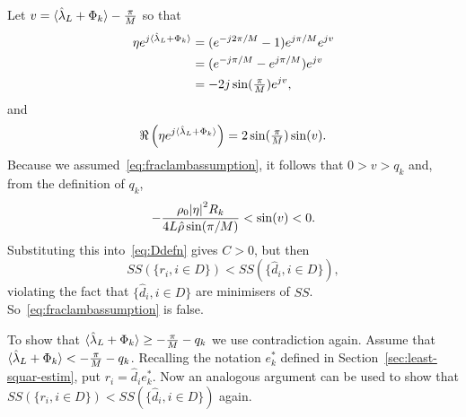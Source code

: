 \documentclass[draftcls, onecolumn, 11pt]{IEEEtran}
\begin{document}
\begin{IEEEproof}
Let $v = \langle \hat{\lambda}_L + \Phi_k \rangle - \tfrac{\pi}{M}$ so that
\begin{align*}
\eta e^{j\langle \hat{\lambda}_L + \Phi_k \rangle} &= (e^{-j2\pi/M} - 1) e^{j \pi/M} e^{jv} \\
&= (e^{-j\pi/M} - e^{j\pi/M}) e^{jv} \\
&= -2 j \sin(\tfrac{\pi}{M}) e^{j v },
\end{align*}
and
\[
\Re\left( \eta e^{j\langle \hat{\lambda}_L + \Phi_k \rangle}\right) = 2 \sin(\tfrac{\pi}{M}) \sin(v).
\]
Because we assumed~\eqref{eq:fraclambassumption}, it follows that $0 > v > q_k$ and, from the definition of $q_k$,
\[
 -\frac{\rho_0 {\vert \eta \vert}^2 R_k}{4 L \hat{\rho} \sin(\pi/M)} <  \sin(v) < 0.
\]
Substituting this into~\eqref{eq:Ddefn} gives $C > 0$, but then 
\[
SS(\{r_i, i \in D\}) < SS(\{\hat{d}_i, i \in D\}),
\] 
violating the fact that $\{\hat{d}_i, i \in D\}$ are minimisers of $SS$.  So~\eqref{eq:fraclambassumption} is false.

To show that $\langle \hat{\lambda}_L + \Phi_k \rangle \geq -\frac{\pi}{M} - q_k$ we use contradiction again.  Assume that $\langle \hat{\lambda}_L + \Phi_k \rangle < -\frac{\pi}{M} - q_k$.  Recalling the notation $e_k^*$ defined in Section~\ref{sec:least-squar-estim}, put $r_i = \hat{d}_i e_k^*$.  Now an analogous argument can be used to show that $SS(\{r_i, i \in D\}) < SS(\{\hat{d}_i, i \in D\})$ again.
\end{IEEEproof}
\end{document}
